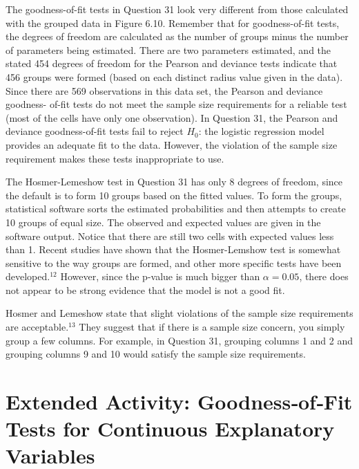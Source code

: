 \documentclass[
]{report}
\begin{document}
The goodness-of-fit tests in Question 31 look very different from those calculated with the grouped data
in Figure 6.10. Remember that for goodness-of-fit tests, the degrees of freedom are calculated as the number of
groups minus the number of parameters being estimated. There are two parameters estimated, and the stated 454
degrees of freedom for the Pearson and deviance tests indicate that 456 groups were formed (based on each distinct
radius value given in the data). Since there are 569 observations in this data set, the Pearson and deviance goodness-
of-fit tests do not meet the sample size requirements for a reliable test (most of the cells have only one observation).
In Question 31, the Pearson and deviance goodness-of-fit tests fail to reject \(H_0\): the logistic regression
model provides an adequate fit to the data. However, the violation of the sample size requirement makes these
tests inappropriate to use.

The Hosmer-Lemeshow test in Question 31 has only 8 degrees of freedom, since the default is to form 10
groups based on the fitted values. To form the groups, statistical software sorts the estimated probabilities and
then attempts to create 10 groups of equal size. The observed and expected values are given in the software
output. Notice that there are still two cells with expected values less than 1. Recent studies have shown that
the Hosmer-Lemshow test is somewhat sensitive to the way groups are formed, and other more specific tests
have been developed.\(^12\) However, since the p-value is much bigger than \(\alpha = 0.05\), there does not appear to
be strong evidence that the model is not a good fit.

Hosmer and Lemeshow state that slight violations of the sample size requirements are acceptable.\(^13\) They
suggest that if there is a sample size concern, you simply group a few columns. For example, in Question
31, grouping columns 1 and 2 and grouping columns 9 and 10 would satisfy the sample size requirements.

\hypertarget{extended-activity-goodnessoffit-tests-for-continuous-explanatory-variables-1}{%
\section*{Extended Activity: Goodness‐of‐Fit Tests for Continuous Explanatory Variables}\label{extended-activity-goodnessoffit-tests-for-continuous-explanatory-variables-1}}
\end{document}
